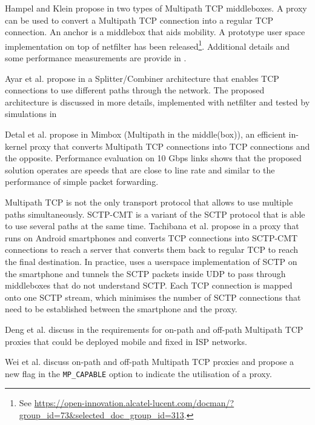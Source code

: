 Hampel and Klein propose in \cite{draft-hampel-mptcp-proxies-anchors} two types of Multipath TCP middleboxes. A proxy can be used to convert a Multipath TCP 
connection into a regular TCP connection. An anchor is a middlebox that aids mobility.  
A prototype user space implementation on top of netfilter has been released\footnote{See \url{https://open-innovation.alcatel-lucent.com/docman/?group_id=73&selected_doc_group_id=313}.}. Additional details and some performance measurements are provide in \cite{Hampel_Seamless:2013}.

Ayar et al. propose in \cite{draft-ayar-transparent-sca-proxy-00} a Splitter/Combiner architecture that enables TCP connections to use different paths
through the network. The proposed architecture is discussed in more details, implemented with netfilter and tested by simulations in \cite{Ayar_SCA:2012,Ayar_TCP:2012}

Detal et al. propose in \cite{Detal_Mimbox:2013} Mimbox (Multipath in the middle(box)), an efficient in-kernel proxy that converts Multipath TCP connections into TCP connections and the opposite. Performance evaluation on 10 Gbps links shows that
the proposed solution operates are speeds that are close to line rate and similar to the performance of simple packet forwarding.

Multipath TCP is not the only transport protocol that allows to use multiple paths simultaneously. SCTP-CMT is a variant of the SCTP protocol that is able to use several paths at the same time. Tachibana et al. propose in \cite{Tachibana_proxy:2014} a 
proxy that runs on Android smartphones and converts TCP connections into SCTP-CMT connections to reach a server that
converts them back to regular TCP to reach the final destination.
In practice, \cite{Tachibana_proxy:2014} uses a userspace implementation of SCTP on the smartphone and tunnels the SCTP packets inside UDP to pass through middleboxes that do not 
understand SCTP. Each TCP connection is mapped onto one SCTP stream, which minimises the number of SCTP connections that need to be established between the smartphone and the proxy.

Deng et al. discuss in \cite{draft-deng-mptcp-proxy} the requirements for on-path and off-path Multipath TCP proxies that could be deployed mobile and fixed in ISP networks. 

Wei et al. \cite{draft-wei-mptcp-proxy-mechanism} discuss on-path and off-path Multipath TCP proxies and propose a new flag in the \texttt{MP\_CAPABLE} option to indicate the utilisation of a proxy.

